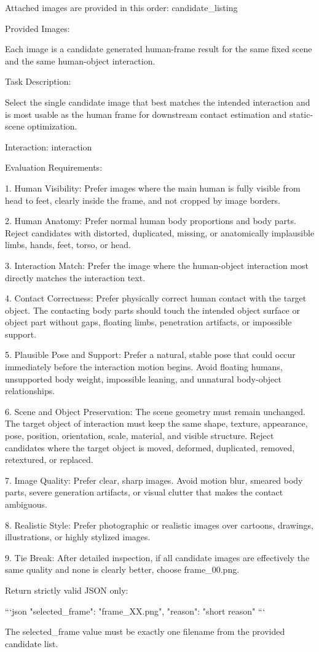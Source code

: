 \begin{promptblock}
Attached images are provided in this order:
{candidate_listing}

Provided Images:

Each image is a candidate generated human-frame result for the same fixed scene and the same human-object interaction.

Task Description:

Select the single candidate image that best matches the intended interaction and is most usable as the human frame for downstream contact estimation and static-scene optimization.

Interaction:
{interaction}

Evaluation Requirements:

1. Human Visibility:
   Prefer images where the main human is fully visible from head to feet, clearly inside the frame, and not cropped by image borders.

2. Human Anatomy:
   Prefer normal human body proportions and body parts. Reject candidates with distorted, duplicated, missing, or anatomically implausible limbs, hands, feet, torso, or head.

3. Interaction Match:
   Prefer the image where the human-object interaction most directly matches the interaction text.

4. Contact Correctness:
   Prefer physically correct human contact with the target object. The contacting body parts should touch the intended object surface or object part without gaps, floating limbs, penetration artifacts, or impossible support.

5. Plausible Pose and Support:
   Prefer a natural, stable pose that could occur immediately before the interaction motion begins. Avoid floating humans, unsupported body weight, impossible leaning, and unnatural body-object relationships.

6. Scene and Object Preservation:
   The scene geometry must remain unchanged. The target object of interaction must keep the same shape, texture, appearance, pose, position, orientation, scale, material, and visible structure. Reject candidates where the target object is moved, deformed, duplicated, removed, retextured, or replaced.

7. Image Quality:
   Prefer clear, sharp images. Avoid motion blur, smeared body parts, severe generation artifacts, or visual clutter that makes the contact ambiguous.

8. Realistic Style:
   Prefer photographic or realistic images over cartoons, drawings, illustrations, or highly stylized images.

9. Tie Break:
   After detailed inspection, if all candidate images are effectively the same quality and none is clearly better, choose frame_00.png.

Return strictly valid JSON only:

```json
{
  "selected_frame": "frame_XX.png",
  "reason": "short reason"
}
```

The selected_frame value must be exactly one filename from the provided candidate list.
\end{promptblock}

